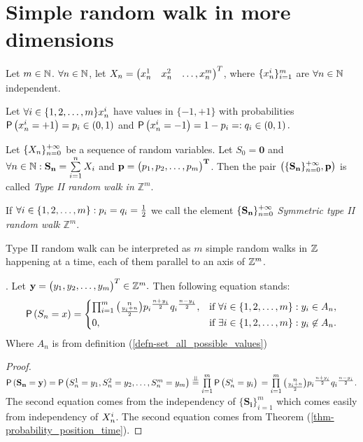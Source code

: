 \chapter{Simple random walk in more dimensions}
\renewcommand{\rw}{$\left( \{\mathbf{\mathbf{S_n}}\}_{n=0}^\pinf, \mathbf{p}\right)$}

\begin{defn}\label{defn-type_II}
  Let $m \in \mathbb{N}$. $\forall n \in \mathbb{N}$, let $X_n=\begin{pmatrix} \x[1] & \x[2]& \ldots, \x[m]\end{pmatrix}^T$, where $\{\x[i]\}_{i=1}^{m}$ are $\forall n \in \mathbb{N}$ independent.

  Let $\forall i \in \jm \x[i]$ have values in $\{-1,+1\}$ with probabilities $\pr \left(\x[i]=+1\right)=p_i \in \left(0,1\right)$ and $\pr \left(\x[i]=-1\right)=1-p_i=:q_i \in  \left(0,1 \right).$

  Let $\{X_n\}_{n=0}^{+\infty}$ be a sequence of \iid random variables. Let $S_0=\mathbf{0}$ and $\forall n \in \N: \mathbf{S_n}=\suma X_i$ and $\bf{p}=\begin{pmatrix}
   p_1, p_2, \ldots, p_m
 \end{pmatrix}^T$. Then the pair $\left(\{\mathbf{S_n}\}_{n=0}^{+\infty}, \mathbf{p} \right)$ is called \emph{Type II random walk in $\mathbb{Z}^m$}.

  If $\forall i \in \{1,2,\ldots, m\}: p_i=q_i=\frac{1}{2}$ we call the element $\{\mathbf{S_n}\}_{n=0}^{+\infty}$ \emph{Symmetric type II random walk $\mathbb{Z}^m$}.
\end{defn}
\begin{rem}
  Type II random walk can be interpreted as $m$ simple random walks in $\mathbb{Z}$ happening at a time, each of them parallel to an axis of $\mathbb{Z}^m$.
\end{rem}

\begin{thm}
  \Lrwm. Let $\mathbf{y}=\begin{pmatrix}
   y_1, y_2, \ldots, y_m
  \end{pmatrix}^T\in \mathbb{Z}^m.$ Then following equation stands:
  \[
  \operatorname{\textsf{P}} \left( S_n=x \right) =
  \begin{cases}
  \prod_{i=1}^{m}\binom{n}{\frac{y_i+n}{2}}{p_i}^{\frac{n+y_i}{2}}{q_i}^{\frac{n-y_i}{2}}, & \text{if $\forall i \in \{1,2,\ldots, m\}:y_i\in A_n$},\\
  0, & \text{if $\exists i \in \{1,2,\ldots, m\}:y_i\not\in A_n$}.
  \end{cases}
  \]
  Where $A_n$ is from definition (\ref{defn-set_all_possible_values})
\end{thm}
\begin{proof}
  $\pr\left(\mathbf{S_n}=\mathbf{y}\right)
    =\pr\left( \s[1]=y_1, \s[2]=y_2, \ldots, \s[m]=y_m\right)
    \overset{\indep}{=}\prod\limits_{i=1}^{m}\pr\left(\s =y_i\right)\\
    =\prod\limits_{i=1}^{m}\binom{n}{\frac{y_i+n}{2}}{p_i}^{\frac{n+y_i}{2}}{q_i}^{\frac{n-y_i}{2}}.$ The second equation comes from the independency of $\{\mathbf{S_i}\}_{i=1}^m$ which comes easily from independency of $\indexx[i][n][X]$. The second equation comes from Theorem (\ref {thm-probability_position_time}).
\end{proof}

